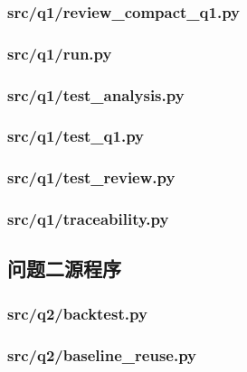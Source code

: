 \documentclass[zihao=-4,a4paper,UTF8,fontset=none]{ctexart}
\begin{document}
\subsubsection*{src/q1/review\_compact\_q1.py}


\subsubsection*{src/q1/run.py}


\subsubsection*{src/q1/test\_analysis.py}


\subsubsection*{src/q1/test\_q1.py}


\subsubsection*{src/q1/test\_review.py}


\subsubsection*{src/q1/traceability.py}


\subsection{问题二源程序}
\subsubsection*{src/q2/backtest.py}


\subsubsection*{src/q2/baseline\_reuse.py}

\end{document}
